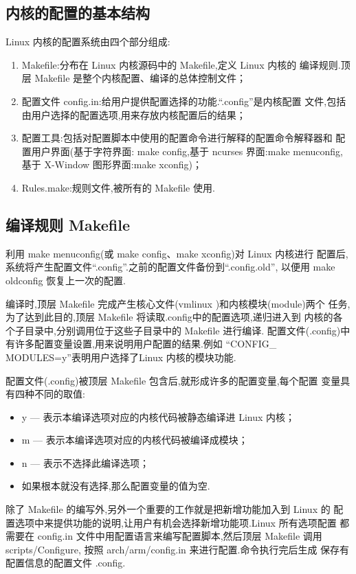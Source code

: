 \subsection{内核的配置的基本结构}
	Linux 内核的配置系统由四个部分组成:
\begin{enumerate}\itemsep=-3pt
  \item Makefile:分布在 Linux 内核源码中的 Makefile,定义 Linux 内核的
		编译规则.顶层 Makefile 是整个内核配置、编译的总体控制文件；
  \item 配置文件 config.in:给用户提供配置选择的功能.``.config''是内核配置
		文件,包括由用户选择的配置选项,用来存放内核配置后的结果；
  \item 配置工具:包括对配置脚本中使用的配置命令进行解释的配置命令解释器和
		配置用户界面(基于字符界面: make config,基于 ncurses 界面:make 
		menuconfig,基于 X-Window 图形界面:make xconfig)；
  \item Rules.make:规则文件,被所有的 Makefile 使用.
\end{enumerate}
\subsection{编译规则 Makefile}
	利用 make menuconfig(或 make config、make xconfig)对 Linux 内核进行
配置后,系统将产生配置文件``.config''.之前的配置文件备份到``.config.old'',
以便用 make oldconfig 恢复上一次的配置.

	编译时,顶层 Makefile 完成产生核心文件(vmlinux )和内核模块(module)两个
任务,为了达到此目的,顶层 Makefile 将读取.config中的配置选项,递归进入到
内核的各个子目录中,分别调用位于这些子目录中的 Makefile 进行编译.
配置文件(.config)中有许多配置变量设置,用来说明用户配置的结果.例如
``CONFIG\_ MODULES=y''表明用户选择了Linux 内核的模块功能.

	配置文件(.config)被顶层 Makefile 包含后,就形成许多的配置变量,每个配置
变量具有四种不同的取值:
\begin{itemize}\itemsep=-3pt
  \item y --- 表示本编译选项对应的内核代码被静态编译进 Linux 内核；
  \item m --- 表示本编译选项对应的内核代码被编译成模块；
  \item n --- 表示不选择此编译选项；
  \item 如果根本就没有选择,那么配置变量的值为空.
\end{itemize}

	除了 Makefile 的编写外,另外一个重要的工作就是把新增功能加入到 Linux 的
配置选项中来提供功能的说明,让用户有机会选择新增功能项.Linux 所有选项配置
都需要在 config.in 文件中用配置语言来编写配置脚本,然后顶层 Makefile 调用
scripts/Configure, 按照 arch/arm/config.in 来进行配置.命令执行完后生成
保存有配置信息的配置文件 .config.


